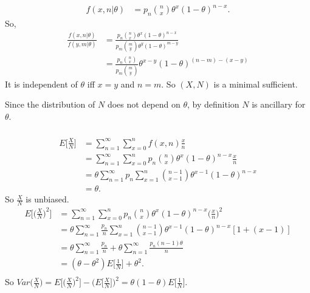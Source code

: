 \subsubsection{} %

\begin{align}
    f(x,n|\theta)
        &= p_n \binom{n}{x} \theta^x(1-\theta)^{n-x}.
\end{align}
So,
\begin{align}
    \frac{f(x,n|\theta)}{f(y, m|\theta)}
    &= \frac{ p_n \binom{n}{x} \theta^x(1-\theta)^{n-x}}
        {p_m \binom{m}{y} \theta^y(1-\theta)^{m-y}} \\
    &= \frac{ p_n \binom{n}{x}} {p_m \binom{m}{y}}
        \theta^{x-y}(1-\theta)^{(n-m)-(x-y)}
\end{align}
It is independent of $\theta$ iff $x=y$ and $n=m$.
So $(X, N)$ is a minimal sufficient.

Since the distribution of $N$ does not depend on $\theta$,
by definition $N$ is ancillary for $\theta$.

\subsubsection{} %

\begin{align}
    E\bigg[\frac{X}{N}\bigg]
        &= \sum_{n=1}^\infty \sum_{x=0}^n f(x,n) \frac{x}{n} \\
        &= \sum_{n=1}^\infty \sum_{x=0}^n p_n \binom{n}{x} \theta^x(1-\theta)^{n-x} \frac{x}{n} \\
        &= \theta \sum_{n=1}^\infty p_n \sum_{x=1}^n \binom{n-1}{x-1} \theta^{x-1}(1-\theta)^{n-x} \\
        &= \theta.
\end{align}
So $\frac{X}{N}$ is unbiased.
\begin{align}
    E\bigg[\bigg(\frac{X}{N}\bigg)^2\bigg]
        &= \sum_{n=1}^\infty \sum_{x=0}^n p_n \binom{n}{x} \theta^x(1-\theta)^{n-x} \bigg(\frac{x}{n}\bigg)^2 \\
        &= \theta \sum_{n=1}^\infty \frac{p_n}{n} \sum_{x=1}^n \binom{n-1}{x-1} \theta^{x-1}(1-\theta)^{n-x}[1+(x-1)] \\
        &= \theta \sum_{n=1}^\infty \frac{p_n}{n}
            + \theta \sum_{n=1}^\infty\frac{p_n(n-1)\theta}{n} \\
        &= (\theta - \theta^2) E\bigg[\frac{1}{N}\bigg] + \theta^2. \\
\end{align}
So $Var\big(\frac{X}{N}\big) = E\big[\big(\frac{X}{N}\big)^2\big] - \big(E\big[\frac{X}{N}\big]\big)^2=\theta(1-\theta)E\big[\frac{1}{N}\big]$.
